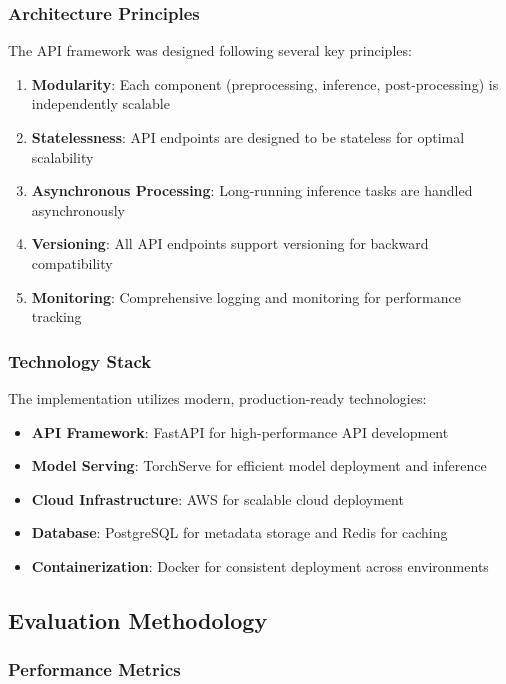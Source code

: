 \documentclass[12pt,a4paper]{article}
\begin{document}
\subsubsection{Architecture Principles}

The API framework was designed following several key principles:

\begin{enumerate}
    \item \textbf{Modularity}: Each component (preprocessing, inference, post-processing) is independently scalable
    \item \textbf{Statelessness}: API endpoints are designed to be stateless for optimal scalability
    \item \textbf{Asynchronous Processing}: Long-running inference tasks are handled asynchronously
    \item \textbf{Versioning}: All API endpoints support versioning for backward compatibility
    \item \textbf{Monitoring}: Comprehensive logging and monitoring for performance tracking
\end{enumerate}

\subsubsection{Technology Stack}

The implementation utilizes modern, production-ready technologies:

\begin{itemize}
    \item \textbf{API Framework}: FastAPI for high-performance API development
    \item \textbf{Model Serving}: TorchServe for efficient model deployment and inference
    \item \textbf{Cloud Infrastructure}: AWS for scalable cloud deployment
    \item \textbf{Database}: PostgreSQL for metadata storage and Redis for caching
    \item \textbf{Containerization}: Docker for consistent deployment across environments
\end{itemize}

\subsection{Evaluation Methodology}

\subsubsection{Performance Metrics}
\end{document}
